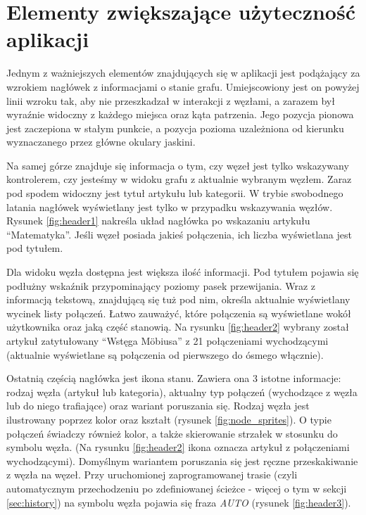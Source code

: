 \section{Elementy zwiększające użyteczność aplikacji}
\label{sec:elementy}
Jednym z ważniejszych elementów znajdujących się w aplikacji jest podążający za wzrokiem nagłówek z informacjami o stanie grafu. Umiejscowiony jest on powyżej linii wzroku tak, aby nie przeszkadzał w interakcji z węzłami, a zarazem był wyraźnie widoczny z każdego miejsca oraz kąta patrzenia. Jego pozycja pionowa jest zaczepiona w stałym punkcie, a pozycja pozioma uzależniona od kierunku wyznaczanego przez główne okulary jaskini.

Na samej górze znajduje się informacja o tym, czy węzeł jest tylko wskazywany kontrolerem, czy jesteśmy w widoku grafu z aktualnie wybranym węzłem. Zaraz pod spodem widoczny jest tytuł artykułu lub kategorii. W trybie swobodnego latania nagłówek wyświetlany jest tylko w przypadku wskazywania węzłów. Rysunek \ref{fig:header1} nakreśla układ nagłówka po wskazaniu artykułu ``Matematyka''. Jeśli węzeł posiada jakieś połączenia, ich liczba wyświetlana jest pod tytułem.


Dla widoku węzła dostępna jest większa ilość informacji. Pod tytułem pojawia się podłużny wskaźnik przypominający poziomy pasek przewijania. Wraz z informacją tekstową, znajdującą się tuż pod nim, określa aktualnie wyświetlany wycinek listy połączeń. Łatwo zauważyć, które połączenia są wyświetlane wokół użytkownika oraz jaką część stanowią. Na rysunku \ref{fig:header2} wybrany został artykuł zatytułowany ``Wstęga Möbiusa'' z 21 połączeniami wychodzącymi (aktualnie wyświetlane są połączenia od pierwszego do ósmego włącznie).


Ostatnią częścią nagłówka jest ikona stanu. Zawiera ona 3 istotne informacje: rodzaj węzła (artykuł lub kategoria), aktualny typ połączeń (wychodzące z węzła lub do niego trafiające) oraz wariant poruszania się. Rodzaj węzła jest ilustrowany poprzez kolor oraz kształt (rysunek \ref{fig:node_sprites}). O typie połączeń świadczy również kolor, a także skierowanie strzałek w stosunku do symbolu węzła. (Na rysunku \ref{fig:header2} ikona oznacza artykuł z połączeniami wychodzącymi). Domyślnym wariantem poruszania się jest ręczne przeskakiwanie z węzła na węzeł. Przy uruchomionej zaprogramowanej trasie (czyli automatycznym przechodzeniu po zdefiniowanej ścieżce - więcej o tym w sekcji \ref{sec:history}) na symbolu węzła pojawia się fraza \textit{AUTO} (rysunek \ref{fig:header3}).

